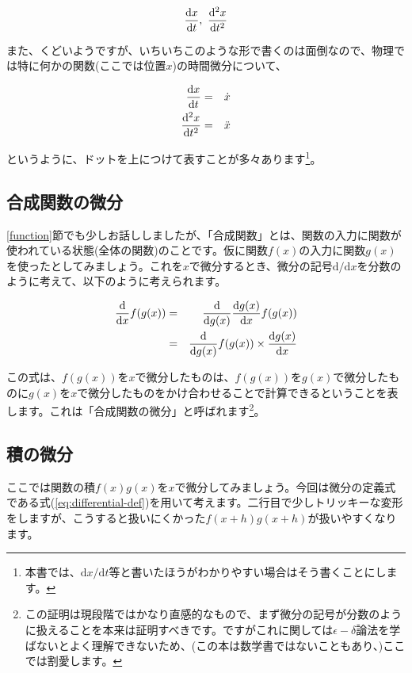 \begin{eqnarray}
    \frac{\mathrm{d}x}{\mathrm{d}t} \notag ,\ 
    \frac{\mathrm{d^2}x}{\mathrm{d}t^2} \notag
\end{eqnarray}

また、くどいようですが、いちいちこのような形で書くのは面倒なので、物理では特に何かの関数(ここでは位置$x$)の時間微分について、

\begin{eqnarray}
    \frac{\mathrm{d}x}{\mathrm{d}t} &=& \dot{x} \notag \\
    \frac{\mathrm{d^2}x}{\mathrm{d}t^2} &=& \ddot{x} \notag
\end{eqnarray}

というように、ドットを上につけて表すことが多々あります\footnote{本書では、$\mathrm{d}x/\mathrm{d}t$等と書いたほうがわかりやすい場合はそう書くことにします。}。


\subsection{合成関数の微分}
\label{differential-composite}
\ref{function}節でも少しお話ししましたが、「合成関数」とは、関数の入力に関数が使われている状態(全体の関数)のことです。仮に関数$f(x)$の入力に関数$g(x)$を使ったとしてみましょう。これを$x$で微分するとき、微分の記号$\mathrm{d}/\mathrm{d}x$を分数のように考えて、以下のように考えられます。

\begin{eqnarray}
    \frac{\mathrm{d}}{\mathrm{d}x}f(g(x)) &=& \frac{\mathrm{d}}{\mathrm{d}g(x)}\frac{\mathrm{d}g(x)}{\mathrm{d}x}f(g(x)) \notag \\
    &=& \frac{\mathrm{d}}{\mathrm{d}g(x)}f(g(x))\times \frac{\mathrm{d}g(x)}{\mathrm{d}x}
\end{eqnarray}

この式は、$f(g(x))$を$x$で微分したものは、$f(g(x))$を$g(x)$で微分したものに$g(x)$を$x$で微分したものをかけ合わせることで計算できるということを表します。これは「合成関数の微分」と呼ばれます\footnote{この証明は現段階ではかなり直感的なもので、まず微分の記号が分数のように扱えることを本来は証明すべきです。ですがこれに関しては$\epsilon-\delta$論法を学ばないとよく理解できないため、(この本は数学書ではないこともあり、)ここでは割愛します。}。

\subsection{積の微分}
\label{differential-product}
ここでは関数の積$f(x)g(x)$を$x$で微分してみましょう。今回は微分の定義式である式(\ref{eq:differential-def})を用いて考えます。二行目で少しトリッキーな変形をしますが、こうすると扱いにくかった$f(x+h)g(x+h)$が扱いやすくなります。

